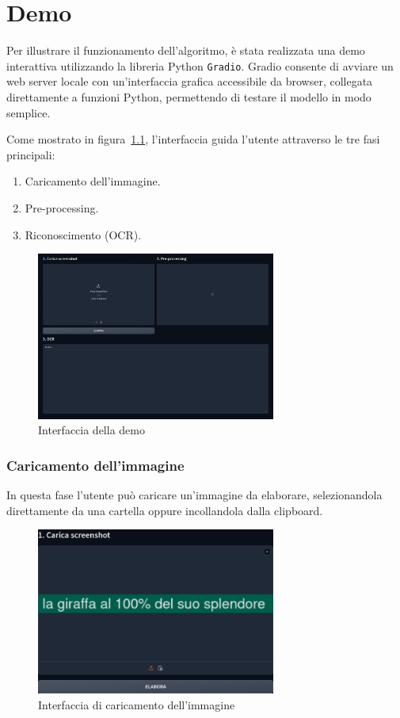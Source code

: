 \chapter{Demo}\label{cap:demo}
Per illustrare il funzionamento dell'algoritmo, è stata realizzata una demo interattiva utilizzando la libreria Python \texttt{Gradio}. Gradio consente di avviare un web server locale con un'interfaccia grafica accessibile da browser, collegata direttamente a funzioni Python, permettendo di testare il modello in modo semplice.

Come mostrato in figura~\ref{fig:demo-general}, l'interfaccia guida l'utente attraverso le tre fasi principali:
\begin{enumerate}
    \item Caricamento dell'immagine.
    \item Pre-processing.
    \item Riconoscimento (OCR).
\end{enumerate}
\begin{figure}[H]
    \centering
    \includegraphics[width=0.7\textwidth]{images/demo_ui.png}
    \caption{Interfaccia della demo}
    \label{fig:demo-general}
\end{figure}

\subsection*{Caricamento dell'immagine}
In questa fase l'utente può caricare un'immagine da elaborare, selezionandola direttamente da una cartella oppure incollandola dalla clipboard.
\begin{figure}[H]
    \centering
    \includegraphics[width=0.7\textwidth]{images/demo-1fase.png}
    \caption{Interfaccia di caricamento dell'immagine}
    \label{fig:demo-1fase}
\end{figure}

